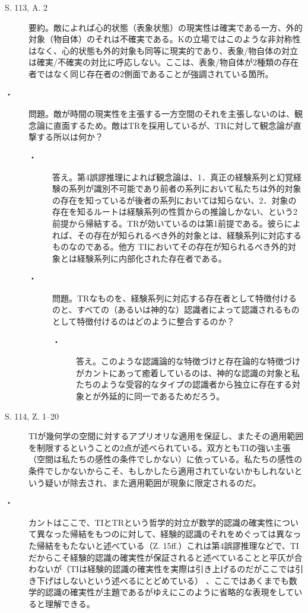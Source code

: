 \documentclass[12pt]{jsarticle}
\begin{document}
\begin{description}
\item[S. 113, A. 2]要約。敵によれば心的状態（表象状態）の現実性は確実である一方、外的対象（物自体）のそれは不確実である。Kの立場ではこのような非対称性はなく、心的状態も外的対象も同等に現実的であり、表象/物自体の対立は確実/不確実の対比に呼応しない。ここは、表象/物自体が2種類の存在者ではなく同じ存在者の2側面であることが強調されている箇所。
\item[・] 問題。敵が時間の現実性を主張する一方空間のそれを主張しないのは、観念論に直面するため。敵はTRを採用しているが、TRに対して観念論が直撃する所以は何か？
\begin{description}
\item[・]答え。第4誤謬推理によれば観念論は、1．真正の経験系列と幻覚経験の系列が識別不可能であり前者の系列において私たちは外的対象の存在を知っているが後者の系列においては知らない、2．対象の存在を知るルートは経験系列の性質からの推論しかない、という2前提から帰結する。TRが効いているのは第1前提である。彼らによれば、その存在が知られるべき外的対象とは、経験系列に対応するものなのである。他方 TIにおいてその存在が知られるべき外的対象とは経験系列に内部化された存在者である。
\item[・]問題。TRなものを、経験系列に対応する存在者として特徴付けるのと、すべての（あるいは神的な）認識者によって認識されるものとして特徴付けるのはどのように整合するのか？
\begin{description}
\item[・]答え。このような認識論的な特徴づけと存在論的な特徴づけがカントにあって癒着しているのは、神的な認識の対象と私たちのような受容的なタイプの認識者から独立に存在する対象とが外延的に同一であるためだろう。
\end{description}
\end{description}
\item[S. 114, Z. 1--20]TIが幾何学の空間に対するアプリオリな適用を保証し、またその適用範囲を制限するということの2点が述べられている。双方ともTIの強い主張（空間は私たちの感性の条件でしかない）に依っている。私たちの感性の条件でしかないからこそ、もしかしたら適用されていないかもしれないという疑いが除去され、また適用範囲が現象に限定されるのだ。
\item[・]
カントはここで、TIとTRという哲学的対立が数学的認識の確実性について異なった帰結をもつのに対して、経験的認識のそれをめぐっては異なった帰結をもたないと述べている（Z. 15ff.）これは第4誤謬推理などで、TIだからこそ経験的認識の確実性が保証されると述べていることと平仄が合わないが（TIは経験的認識の確実性を実際は引き上げるのだがここでは引き下げはしないという述べるにとどめている） 、ここではあくまでも数学的認識の確実性が主題であるがゆえにこのように省略的な表現をしていると理解できる。
\end{description}
\end{document}
